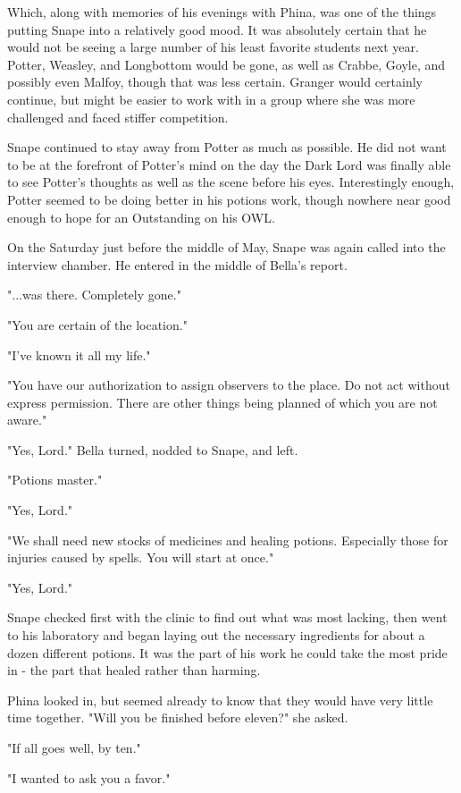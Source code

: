 Which, along with memories of his evenings with Phina, was one of the things putting Snape into a relatively good mood. It was absolutely certain that he would not be seeing a large number of his least favorite students next year. Potter, Weasley, and Longbottom would be gone, as well as Crabbe, Goyle, and possibly even Malfoy, though that was less certain. Granger would certainly continue, but might be easier to work with in a group where she was more challenged and faced stiffer competition.

Snape continued to stay away from Potter as much as possible. He did not want to be at the forefront of Potter's mind on the day the Dark Lord was finally able to see Potter's thoughts as well as the scene before his eyes. Interestingly enough, Potter seemed to be doing better in his potions work, though nowhere near good enough to hope for an Outstanding on his OWL.

On the Saturday just before the middle of May, Snape was again called into the interview chamber. He entered in the middle of Bella's report.

"...was there. Completely gone."

"You are certain of the location."

"I've known it all my life."

"You have our authorization to assign observers to the place. Do not act without express permission. There are other things being planned of which you are not aware."

"Yes, Lord." Bella turned, nodded to Snape, and left.

"Potions master."

"Yes, Lord."

"We shall need new stocks of medicines and healing potions. Especially those for injuries caused by spells. You will start at once."

"Yes, Lord."

Snape checked first with the clinic to find out what was most lacking, then went to his laboratory and began laying out the necessary ingredients for about a dozen different potions. It was the part of his work he could take the most pride in - the part that healed rather than harming.

Phina looked in, but seemed already to know that they would have very little time together. "Will you be finished before eleven?" she asked.

"If all goes well, by ten."

"I wanted to ask you a favor."

